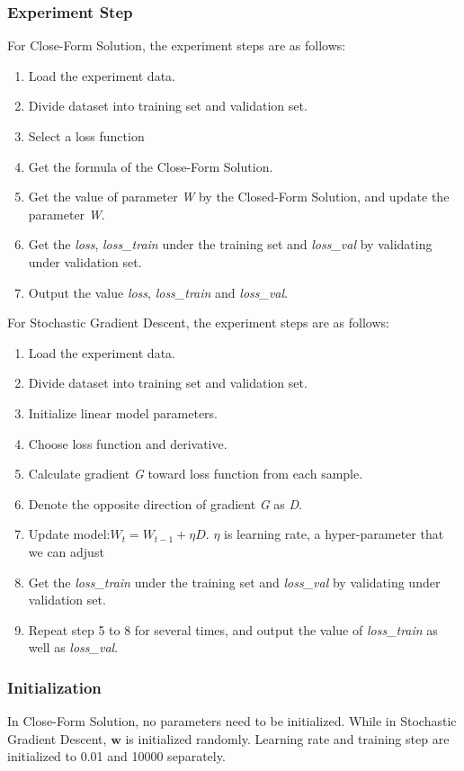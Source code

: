 \documentclass[journal, a4paper]{IEEEtran}
\begin{document}
\subsubsection{Experiment Step}
For Close-Form Solution, the experiment steps are as follows:
\begin{enumerate}
  \item Load the experiment data.
  \item Divide dataset into training set and validation set.
  \item Select a loss function
  \item Get the formula of the Close-Form Solution.
  \item Get the value of parameter \textit{W} by the Closed-Form Solution, and update the parameter \textit{W}.
  \item Get the \textit{loss}, \textit{loss\_train} under the training set and \textit{loss\_val} by validating under validation set.
  \item Output the value \textit{loss}, \textit{loss\_train} and \textit{loss\_val}.
\end{enumerate}
For Stochastic Gradient Descent, the experiment steps are as follows:
\begin{enumerate}
  \item Load the experiment data.
  \item Divide dataset into training set and validation set.
  \item Initialize linear model parameters.
  \item Choose loss function and derivative.
  \item Calculate gradient \textit{G} toward loss function from each sample.
  \item Denote the opposite direction of gradient \textit{G} as \textit{D}.
  \item Update model:$W_t=W_{t-1}+\eta D$. $\eta$ is learning rate, a hyper-parameter that we can adjust
  \item Get the \textit{loss\_train} under the training set and \textit{loss\_val} by validating under validation set.
  \item Repeat step 5 to 8 for several times, and output the value of \textit{loss\_train} as well as \textit{loss\_val}.
\end{enumerate}
\subsubsection{Initialization}
In Close-Form Solution, no parameters need to be initialized. While in Stochastic Gradient Descent, $\bm{w}$ is initialized randomly. Learning rate and training step are initialized to 0.01 and 10000 separately.
\end{document}

